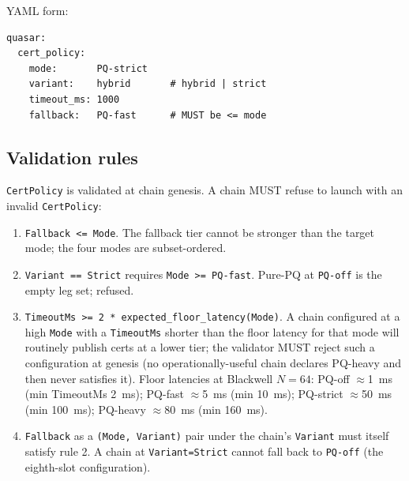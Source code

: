 YAML form:

\begin{verbatim}
quasar:
  cert_policy:
    mode:       PQ-strict
    variant:    hybrid       # hybrid | strict
    timeout_ms: 1000
    fallback:   PQ-fast      # MUST be <= mode
\end{verbatim}

\subsection{Validation rules}

\texttt{CertPolicy} is validated at chain genesis. A chain MUST
refuse to launch with an invalid \texttt{CertPolicy}:

\begin{enumerate}[leftmargin=2em,nosep]
\item \texttt{Fallback <= Mode}. The fallback tier cannot be stronger
  than the target mode; the four modes are subset-ordered.
\item \texttt{Variant == Strict} requires \texttt{Mode >= PQ-fast}.
  Pure-PQ at \texttt{PQ-off} is the empty leg set; refused.
\item \texttt{TimeoutMs >= 2 * expected\_floor\_latency(Mode)}. A
  chain configured at a high \texttt{Mode} with a \texttt{TimeoutMs}
  shorter than the floor latency for that mode will routinely publish
  certs at a lower tier; the validator MUST reject such a
  configuration at genesis (no operationally-useful chain declares
  PQ-heavy and then never satisfies it). Floor latencies at
  Blackwell $N{=}64$:
  PQ-off $\approx$\SI{1}{\milli\second} (min TimeoutMs
  \SI{2}{\milli\second});
  PQ-fast $\approx$\SI{5}{\milli\second} (min \SI{10}{\milli\second});
  PQ-strict $\approx$\SI{50}{\milli\second} (min
  \SI{100}{\milli\second});
  PQ-heavy $\approx$\SI{80}{\milli\second} (min
  \SI{160}{\milli\second}).
\item \texttt{Fallback} as a \texttt{(Mode, Variant)} pair under the
  chain's \texttt{Variant} must itself satisfy rule 2. A chain at
  \texttt{Variant=Strict} cannot fall back to \texttt{PQ-off} (the
  eighth-slot configuration).
\end{enumerate}
